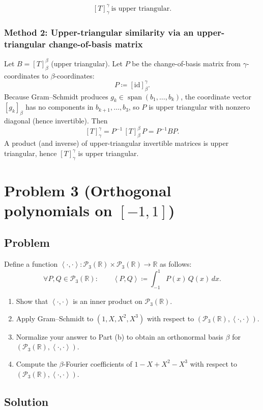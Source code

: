 \documentclass[12pt]{article}
\newcommand{\df}{\coloneqq}
\newcommand{\R}{\mathbb{R}}
\newcommand{\cP}{\mathcal{P}}
\DeclareMathOperator{\Span}{span}
\newcommand{\Id}{\mathrm{id}}
\newcommand{\ip}[2]{\left\langle #1,#2\right\rangle}
\begin{document}
\[
\boxed{\, [T]_{\gamma}^{\gamma}\ \text{is upper triangular.}\,}
\]

\subsubsection{Method 2: Upper-triangular similarity via an upper-triangular change-of-basis matrix}
Let $B=[T]_{\beta}^{\beta}$ (upper triangular). Let $P$ be the change-of-basis matrix from $\gamma$-coordinates to $\beta$-coordinates:
\[
P \df [\Id]_{\beta}^{\gamma}.
\]
Because Gram--Schmidt produces $g_k\in\Span(b_1,\dots,b_k)$, the coordinate vector $[g_k]_\beta$ has no components in $b_{k+1},\dots,b_3$,
so $P$ is upper triangular with nonzero diagonal (hence invertible).
Then
\[
[T]_{\gamma}^{\gamma}=P^{-1}\,[T]_{\beta}^{\beta}\,P=P^{-1}BP.
\]
A product (and inverse) of upper-triangular invertible matrices is upper triangular, hence $[T]_{\gamma}^{\gamma}$ is upper triangular.

\newpage
\section{Problem 3 (Orthogonal polynomials on $[-1,1]$)}
\subsection{Problem}
Define a function $\ip{\cdot}{\cdot}:\cP_3(\R)\times \cP_3(\R)\to \R$ as follows:
\[
\forall P,Q\in\cP_3(\R):\qquad
\ip{P}{Q}\df \int_{-1}^{1} P(x)\,Q(x)\,dx.
\]
\begin{enumerate}[label=(\alph*)]
\item Show that $\ip{\cdot}{\cdot}$ is an inner product on $\cP_3(\R)$.
\item Apply Gram--Schmidt to $(1,X,X^2,X^3)$ with respect to $(\cP_3(\R),\ip{\cdot}{\cdot})$.
\item Normalize your answer to Part (b) to obtain an orthonormal basis $\beta$ for $(\cP_3(\R),\ip{\cdot}{\cdot})$.
\item Compute the $\beta$-Fourier coefficients of $1-X+X^2-X^3$ with respect to $(\cP_3(\R),\ip{\cdot}{\cdot})$.
\end{enumerate}

\subsection{Solution}
\end{document}
